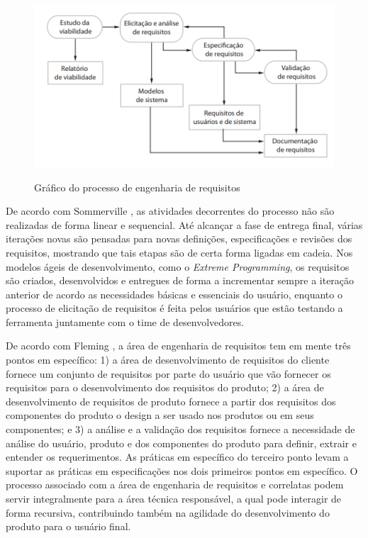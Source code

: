 \begin{figure}
    \centering
    \includegraphics{img/eng_req.png}
    \caption{Gráfico do processo de engenharia de requisitos} \cite{Sommerville07}
    \label{fig:eng_req}
\end{figure}


De acordo com Sommerville \cite{Sommerville07}, as atividades decorrentes do processo não são realizadas de forma linear e sequencial. Até alcançar a fase de entrega final, várias iterações novas são pensadas para novas definições, especificações e revisões dos requisitos, mostrando que tais etapas são de certa forma ligadas em cadeia. Nos modelos ágeis de desenvolvimento, como o \textit{Extreme Programming}, os requisitos são criados, desenvolvidos e entregues de forma a incrementar sempre a iteração anterior de acordo as necessidades básicas e essenciais do usuário, enquanto o processo de elicitação de requisitos é feita pelos usuários que estão testando a ferramenta juntamente com o time de desenvolvedores.
 
 De acordo com Fleming \cite{cmmi}, a área de engenharia de requisitos tem em mente três pontos em específico: 1) a área de desenvolvimento de requisitos do cliente fornece um conjunto de requisitos por parte do usuário que vão fornecer os requisitos para o desenvolvimento dos requisitos do produto; 2) a área de desenvolvimento de requisitos de produto fornece a partir dos requisitos dos componentes do produto o design a ser usado nos produtos ou em seus componentes; e 3) a análise e a validação dos requisitos fornece a necessidade de análise do usuário, produto e dos componentes do produto para definir, extrair e entender os requerimentos. As práticas em específico do terceiro ponto levam a suportar as práticas em especificações nos dois primeiros pontos em específico. O processo associado com a área de engenharia de requisitos e correlatas podem servir integralmente para a área técnica responsável, a qual pode interagir de forma recursiva, contribuindo também na agilidade do desenvolvimento do produto para o usuário final.
 
